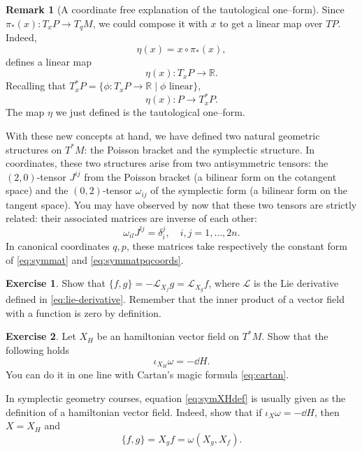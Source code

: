 \documentclass[english,fontsize=11pt,paper=b5]{scrbook}
\theoremstyle{definition}
\newtheorem{remark}{Remark}[chapter]
\newtheorem{exercise}{Exercise}[chapter]
\begin{document}
\begin{remark}[A coordinate free explanation of the tautological one--form]
      Since $\pi_*(x): T_x P \to T_q M$, we could compose it with $x$ to get a linear map over $TP$. Indeed,
      \begin{equation}
        \eta(x) = x \circ \pi_*(x),
      \end{equation}
      defines a linear map
      \begin{equation}
        \eta(x):T_xP\to\mathbb{R}.
      \end{equation}
      Recalling that $T_x^*P = \big\{\phi: T_x P \to \mathbb{R} \mid \phi\mbox{ linear}\big\}$,
      \begin{equation}
        \eta(x) : P \to T^*_x P.
      \end{equation}
      The map $\eta$ we just defined is the tautological one--form.
    \end{remark}

    With these new concepts at hand, we have defined two natural geometric structures on $T^* M$: the Poisson bracket and the symplectic structure.
    In coordinates, these two structures arise from two antisymmetric tensors: the $(2,0)$-tensor $J^{ij}$ from the Poisson bracket (a bilinear form on the cotangent space) and the $(0,2)$-tensor $\omega_{ij}$ of the symplectic form (a bilinear form on the tangent space).
    You may have observed by now that these two tensors are strictly related: their associated matrices are inverse of each other:
    \begin{equation}\label{eq:omegaJinverse}
      \omega_{il}J^{lj} = \delta_i^j, \quad i,j = 1,\ldots, 2n.
    \end{equation}
    In canonical coordinates $q,p$, these matrices take respectively the constant form of \eqref{eq:symmat} and \eqref{eq:symmatpqcoords}.

    \begin{exercise}
      Show that $\big\{f,g\big\} = -\mathcal{L}_{X_f} g = \mathcal{L}_{X_g} f$, where $\mathcal{L}$ is the Lie derivative defined in \eqref{eq:lie-derivative}.
      Remember that the inner product of a vector field with a function is zero by definition.
    \end{exercise}

    \begin{exercise}\label{exe:altdefomega}
      Let $X_H$ be an hamiltonian vector field on $T^*M$.
      Show that the following holds
      \begin{equation}\label{eq:symXHdef}
        \iota_{X_H}\omega = -\dd H.
      \end{equation}
      You can do it in one line with Cartan's magic formula \eqref{eq:cartan}.

      In symplectic geometry courses, equation \eqref{eq:symXHdef} is usually given as the definition of a hamiltonian vector field.
      Indeed, show that if $\iota_{X}\omega = -\dd H$, then $X=X_H$ and
      \begin{equation}
        \{f,g\} = X_g f = \omega(X_g, X_f).
      \end{equation}
    \end{exercise}
\end{document}
